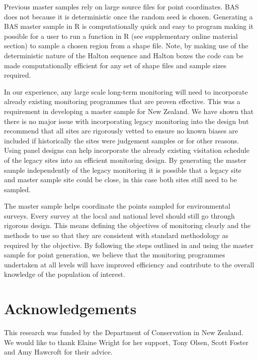 \documentclass[titlepage]{article}
\begin{document}
Previous master samples rely on large source files for point coordinates. BAS does not because it is deterministic once the random seed is chosen. Generating a BAS master sample in R is computationally quick and easy to program making it possible for a user to run a function in R (see supplementary online material section) to sample a chosen region from a shape file. Note, by making use of the deterministic nature of the Halton sequence and Halton boxes \citep{Robertson2017} the code can be made computationally efficient for any set of shape files and sample sizes required.

In our experience, any large scale long-term monitoring will need to incorporate already existing monitoring programmes that are proven effective. This was a requirement in developing a master sample for New Zealand. We have shown that there is no major issue with incorporating legacy monitoring into the design but recommend that all sites are rigorously vetted to ensure no known biases are included if historically the sites were judgement samples or for other reasons. Using panel designs can help incorporate the already existing visitation schedule of the legacy sites into an efficient monitoring design. By generating the master sample independently of the legacy monitoring it is possible that a legacy site and master sample site could be close, in this case both sites still need to be sampled.

The master sample helps coordinate the points sampled for environmental surveys. Every survey at the local and national level should still go through rigorous design. This means defining the objectives of monitoring clearly and the methods to use so that they are consistent with standard methodology as required by the objective. By following the steps outlined in \citet{Reynolds2016} and using the master sample for point generation, we believe that the monitoring programmes undertaken at all levels will have improved efficiency and contribute to the overall knowledge of the population of interest.

\section{Acknowledgements}
This research was funded by the Department of Conservation in New Zealand. We would like to thank Elaine Wright for her support, Tony Olsen, Scott Foster and Amy Hawcroft for their advice.

	
\end{document}
